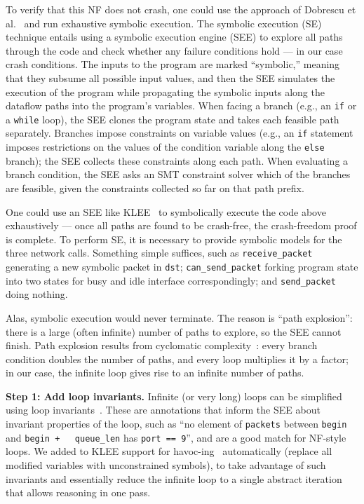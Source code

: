 \documentclass[letterpaper,twocolumn,10pt]{article}
\newcommand{\code}[1]{\lstinline{#1}}
\begin{document}
To verify that this NF does not crash, one could use the approach of Dobrescu et
al.~\cite{dobrescu2014software} and run exhaustive symbolic execution. The
symbolic execution (SE) technique entails using a symbolic execution engine
(SEE) to explore all paths through the code and check whether any failure
conditions hold --- in our case crash conditions. The inputs to the program are
marked ``symbolic,'' meaning that they subsume all possible input values, and
then the SEE simulates the execution of the program while propagating the
symbolic inputs along the dataflow paths into the program's variables. When
facing a branch (e.g., an \code{if} or a \code{while} loop), the SEE clones the
program state and takes each feasible path separately. Branches impose
constraints on variable values (e.g., an \code{if} statement imposes
restrictions on the values of the condition variable along the \code{else}
branch); the SEE collects these constraints along each path. When evaluating a
branch condition, the SEE asks an SMT constraint solver which of the branches
are feasible, given the constraints collected so far on that path prefix.

One could use an SEE like KLEE~\cite{cadar2008klee} to symbolically execute the
code above exhaustively --- once all paths are found to be crash-free, the
crash-freedom proof is complete. To perform SE, it is necessary to provide
symbolic models for the three network calls. Something simple suffices, such as
\code{receive_packet} generating a new symbolic packet in \code{dst};
\code{can_send_packet} forking program state into two states for busy and idle
interface correspondingly; and \code{send_packet} doing nothing.

Alas, symbolic execution would never terminate. The reason is ``path
explosion'': there is a large (often infinite) number of paths to explore, so
the SEE cannot finish. Path explosion results from cyclomatic
complexity~\cite{mccabe:cyclomatic}: every branch condition doubles the number
of paths, and every loop multiplies it by a factor; in our case, the infinite
loop gives rise to an infinite number of paths.

{\bf Step 1: Add loop invariants.} Infinite (or very long) loops can be
simplified using loop invariants~\cite[\S~2.1]{cormen2009introduction}. These
are annotations that inform the SEE about invariant properties of the loop, such
as ``no element of \code{packets} between \code{begin} and \code{begin +
  queue_len} has \code{port == 9}'', and are a good match for NF-style loops. We
added to KLEE support for havoc-ing~\cite{barnett2005boogie} automatically
(replace all modified variables with unconstrained symbols), to take advantage
of such invariants and essentially reduce the infinite loop to a single abstract
iteration that allows reasoning in one pass.
 
\end{document}
